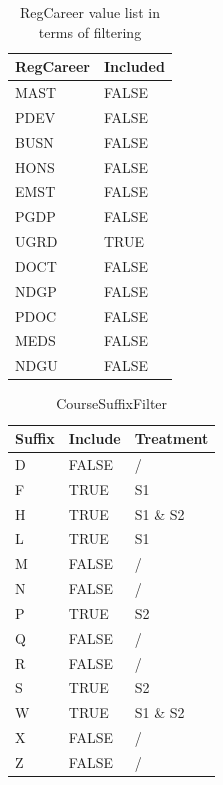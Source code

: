 \begin{table}[]
  \centering
  \caption{RegCareer value list in terms of filtering}
  \label{RegCareerFilter}
  \begin{tabular}{ll}
    RegCareer & Included \\ \hline
    MAST      & FALSE    \\
    PDEV      & FALSE    \\
    BUSN      & FALSE    \\
    HONS      & FALSE    \\
    EMST      & FALSE    \\
    PGDP      & FALSE    \\
    UGRD      & TRUE     \\
    DOCT      & FALSE    \\
    NDGP      & FALSE    \\
    PDOC      & FALSE    \\
    MEDS      & FALSE    \\
    NDGU      & FALSE    \\ \hline
  \end{tabular}
\end{table}

\begin{table}[]
  \centering
  \caption{CourseSuffixFilter}
  \label{CourseSuffixFilter}
  \begin{tabular}{lll}
    Suffix & Include & Treatment \\ \hline
    D      & FALSE   & /         \\
    F      & TRUE    & S1        \\
    H      & TRUE    & S1 \& S2  \\
    L      & TRUE    & S1        \\
    M      & FALSE   & /         \\
    N      & FALSE   & /         \\
    P      & TRUE    & S2        \\
    Q      & FALSE   & /         \\
    R      & FALSE   & /         \\
    S      & TRUE    & S2        \\
    W      & TRUE    & S1 \& S2  \\
    X      & FALSE   & /         \\
    Z      & FALSE   & /         \\ \hline
  \end{tabular}
\end{table}

